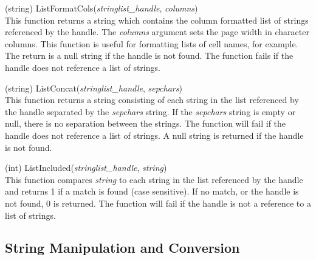 \begin{description}
\item{(string) \vt ListFormatCols({\it stringlist\_handle\/},
 {\it columns\/})}\\
This function returns a string which contains the column formatted
list of strings referenced by the handle.  The {\it columns} argument
sets the page width in character columns.  This function is useful for
formatting lists of cell names, for example.  The return is a null
string if the handle is not found.  The function fails if the handle
does not reference a list of strings.

\item{(string) \vt ListConcat({\it stringlist\_handle\/},
 {\it sepchars\/})}\\
This function returns a string consisting of each string in the list
referenced by the handle separated by the {\it sepchars} string.  If
the {\it sepchars} string is empty or null, there is no separation
between the strings.  The function will fail if the handle does not
reference a list of strings.  A null string is returned if the handle
is not found.

\item{(int) \vt ListIncluded({\it stringlist\_handle\/}, {\it string\/})}\\
This function compares {\it string} to each string in the list
referenced by the handle and returns 1 if a match is found (case
sensitive).  If no match, or the handle is not found, 0 is returned. 
The function will fail if the handle is not a reference to a list of
strings.

\end{description}


\subsection{String Manipulation and Conversion}


